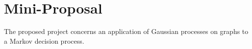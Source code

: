 



\section{Mini-Proposal}\label{sec:mini_prop}


The proposed project concerns an application of Gaussian processes on graphs to a Markov decision process.%

